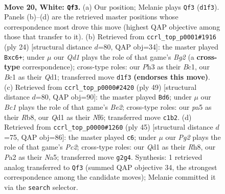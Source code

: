 \documentclass[11pt]{article}
\begin{document}
\clearpage

\begin{figure}[p]\centering
\begin{subfigure}{0.46\textwidth}\centering
\resizebox{\linewidth}{!}{%
\newchessgame
\chessboard[
  setfen={r1bk1bnr/4q3/8/pBp1Pp2/3p1p1p/NP5P/P5P1/R1BQ2KR w - - 2 20},
  showmover=false,
  pgfstyle=straightmove, color=movearrow, markmove={d1-f3}
]}
\caption{}
\end{subfigure}\hfill
\begin{subfigure}{0.46\textwidth}\centering
\resizebox{\linewidth}{!}{%
\newchessgame
\chessboard[
  setfen={rqb1k2r/4bppp/p1p1pn2/4p3/2P5/2N3P1/PP3PBP/R1BQK2R w KQkq - 0 13},
  showmover=false,
  pgfstyle=straightmove, color=movearrow, markmove={g2-c6}
]}
\caption{}
\end{subfigure}
\\[4pt]
\begin{subfigure}{0.46\textwidth}\centering
\resizebox{\linewidth}{!}{%
\newchessgame
\chessboard[
  setfen={1r1q2k1/2r1bpp1/5n1p/1p1PpP2/bP2P3/3B3P/NR2QBPK/5R2 b - - 1 25},
  showmover=false,
  pgfstyle=straightmove, color=movearrow, markmove={e7-d6}
]}
\caption{}
\end{subfigure}\hfill
\begin{subfigure}{0.46\textwidth}\centering
\resizebox{\linewidth}{!}{%
\newchessgame
\chessboard[
  setfen={1k1rqb1r/1pp3p1/5p2/n2p1b1P/3P1P2/P1N1P3/R3BK2/2B3QR b - - 3 23},
  showmover=false,
  pgfstyle=straightmove, color=movearrow, markmove={c7-c6}
]}
\caption{}
\end{subfigure}
\caption{\textbf{Move 20, White: \texttt{Qf3}.} (a) Our position; Melanie plays \texttt{Qf3} (\texttt{d1f3}). Panels (b)--(d) are the retrieved master positions whose correspondence most drove this move (highest QAP objective among those that transfer to it). (b) Retrieved from \texttt{ccrl\_top\_p0001\#1916} (ply 24) [structural distance $d$=80, QAP obj=34]: the master played \texttt{Bxc6+}; under $\mu$ our \emph{Qd1} plays the role of that game's \emph{Bg2} (a \textbf{cross-type} correspondence); cross-type roles: our \emph{P}h3 as their \emph{B}c1, our \emph{B}c1 as their \emph{Q}d1; transferred move \texttt{d1f3} \textbf{(endorses this move)}. (c) Retrieved from \texttt{ccrl\_top\_p0000\#2420} (ply 49) [structural distance $d$=80, QAP obj=90]: the master played \texttt{Bd6}; under $\mu$ our \emph{Bc1} plays the role of that game's \emph{Be2}; cross-type roles: our \emph{p}a5 as their \emph{R}b8, our \emph{Q}d1 as their \emph{N}f6; transferred move \texttt{c1b2}. (d) Retrieved from \texttt{ccrl\_top\_p0000\#1260} (ply 45) [structural distance $d$=75, QAP obj=86]: the master played \texttt{c6}; under $\mu$ our \emph{Pg2} plays the role of that game's \emph{Pc2}; cross-type roles: our \emph{Q}d1 as their \emph{R}h8, our \emph{P}a2 as their \emph{N}a5; transferred move \texttt{g2g4}. Synthesis: 1 retrieved analog transferred to \texttt{Qf3} (summed QAP objective 34, the strongest correspondence among the candidate moves); Melanie committed it via the \texttt{search} selector.}
\label{fig:thought-m38}
\end{figure}
\end{document}
